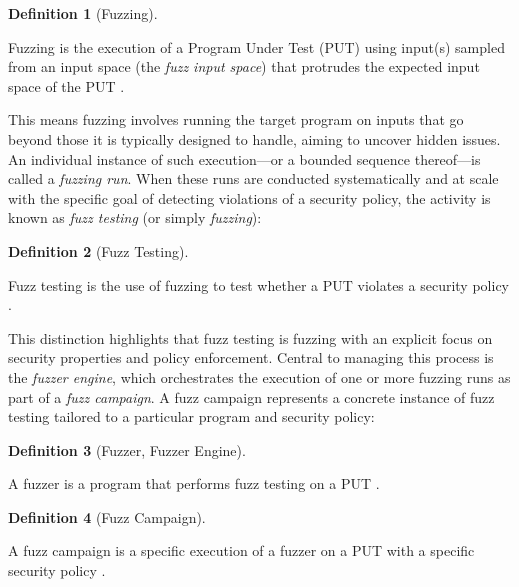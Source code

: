 \documentclass[
  a4paper,
]{scrreprt}
\theoremstyle{definition}
\newtheorem{definition}{Definition}[chapter]
\theoremstyle{remark}
\begin{document}
\begin{definition}[Fuzzing]\protect\hypertarget{def-fuzzing}{}\label{def-fuzzing}

Fuzzing is the execution of a Program Under Test (PUT) using input(s)
sampled from an input space (the \emph{fuzz input space}) that protrudes
the expected input space of the PUT \autocite{manes2019}.

\end{definition}

This means fuzzing involves running the target program on inputs that go
beyond those it is typically designed to handle, aiming to uncover
hidden issues. An individual instance of such execution---or a bounded
sequence thereof---is called a \emph{fuzzing run}. When these runs are
conducted systematically and at scale with the specific goal of
detecting violations of a security policy, the activity is known as
\emph{fuzz testing} (or simply \emph{fuzzing}):

\begin{definition}[Fuzz
Testing]\protect\hypertarget{def-fuzz-testing}{}\label{def-fuzz-testing}

Fuzz testing is the use of fuzzing to test whether a PUT violates a
security policy \autocite{manes2019}.

\end{definition}

This distinction highlights that fuzz testing is fuzzing with an
explicit focus on security properties and policy enforcement. Central to
managing this process is the \emph{fuzzer engine}, which orchestrates
the execution of one or more fuzzing runs as part of a \emph{fuzz
campaign}. A fuzz campaign represents a concrete instance of fuzz
testing tailored to a particular program and security policy:

\begin{definition}[Fuzzer, Fuzzer
Engine]\protect\hypertarget{def-fuzzer}{}\label{def-fuzzer}

A fuzzer is a program that performs fuzz testing on a PUT
\autocite{manes2019}.

\end{definition}

\begin{definition}[Fuzz
Campaign]\protect\hypertarget{def-campaign}{}\label{def-campaign}

A fuzz campaign is a specific execution of a fuzzer on a PUT with a
specific security policy \autocite{manes2019}.

\end{definition}
\end{document}
